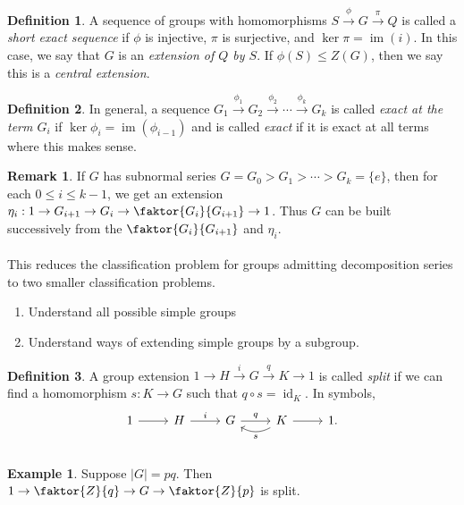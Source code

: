\documentclass[10pt,letterpaper,cm]{nupset}
\theoremstyle{definition}
\newtheorem*{definition}{Definition}
\newtheorem{exmp}{Example}
\newtheorem{remark}{Remark}
\newcommand{\1}{\mathbf{1}}
\newcommand{\0}{\vec 0}
\DeclareMathOperator{\id}{id}
\DeclareMathOperator{\im}{im}
\begin{document}
\begin{definition}
A sequence of groups with homomorphisms $S \overset{\phi}{\to} G \overset{\pi}{\to} Q$ is called a \textit{short exact sequence} if $\phi$ is injective, $\pi$ is surjective, and $\ker \pi = \im(i)$. In this case, we say that $G$ is an \textit{extension of $Q$ by $S$}. If $\phi(S) \leq Z(G)$, then we say this is a \textit{central extension}.
\end{definition}

\begin{definition}
In general, a sequence $G_1 \overset{\phi_1}{\to} G_2 \overset{\phi_2}{\to} \cdots \overset{\phi_k}{\to} G_k$ is called \textit{exact at the term $G_i$} if $\ker \phi_i = \im(\phi_{i-1})$ and is called \textit{exact} if it is exact at all terms where this makes sense.
\end{definition}

\begin{remark}
If $G$ has subnormal series $G = G_0 > G_1 > \cdots > G_k = \{e\}$, then for each $0 \leq i \leq k-1$, we get an extension $\eta_i : 1 \to G_{i+1} \to G_i \to \faktor{G_i}{G_{i+1}} \to 1$. Thus $G$ can be built successively from the $\faktor{G_i}{G_{i+1}}$ and $\eta_i$.
\\ \\ This reduces the classification problem for groups admitting decomposition series to two smaller classification problems.
\begin{enumerate}
\item Understand all possible simple groups
\item Understand ways of extending simple groups by a subgroup.
\end{enumerate}
\end{remark}

\begin{definition}
A group extension $1 \to H  \overset{i}{\to} G \overset{q}{\to} K \to 1$ is called \textit{split} if we can find a homomorphism $s : K \to G$ such that $q \circ s = \id_K$. In symbols, \[
	\begin{tikzcd}
	1\rar & H\rar["i" above] & G\rar["q" above] & K\rar\lar[bend left=30,"s" below] & 1. \\
	\end{tikzcd}
\]
\end{definition}

\begin{exmp}
Suppose $|G|= pq$. Then $1 \to \faktor{Z}{q} \to G \to \faktor{Z}{p}$ is split.
\end{exmp}
\end{document}
